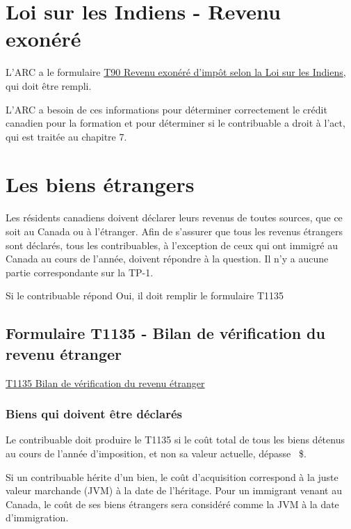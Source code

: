 \section{Loi sur les Indiens - Revenu exonéré}
\begin{intro}
	L'ARC a le formulaire \href{https://www.canada.ca/fr/agence-revenu/services/formulaires-publications/formulaires/t90.html}{T90 Revenu exonéré d'impôt selon la Loi sur les Indiens}, qui doit être rempli.
\end{intro}

\begin{note}
	L'ARC a besoin de ces informations pour déterminer correctement le crédit canadien pour la formation et pour déterminer si le contribuable a droit à l'\acrfull{act}, qui est traitée au chapitre 7.
\end{note}



\section{Les biens étrangers}
\ca
\begin{intro}
	Les résidents canadiens doivent déclarer leurs revenus de toutes sources, que ce soit au Canada ou à l'étranger. Afin de s'assurer que tous les revenus étrangers sont déclarés, tous les contribuables, à l'exception de ceux qui ont immigré au Canada au cours de l'année, doivent répondre à la question. Il n'y a aucune partie correspondante sur la TP-1.
\end{intro}
Si le contribuable répond \og Oui\fg{}, il doit remplir le formulaire T1135


\subsection{Formulaire T1135 - Bilan de vérification du revenu étranger}
\cat\href{https://www.canada.ca/fr/agence-revenu/services/formulaires-publications/formulaires/t1135.html}{T1135 Bilan de vérification du revenu étranger}

\subsubsection{Biens qui doivent être déclarés}
Le contribuable doit produire le T1135 si le coût total de tous les biens détenus au cours de l'année d'imposition, et non sa valeur actuelle, dépasse ~\$.

Si un contribuable hérite d'un bien, le coût d'acquisition correspond à la juste valeur marchande (JVM) à la date de l'héritage. Pour un immigrant venant au Canada, le coût de ses biens étrangers sera considéré comme la JVM à la date d'immigration.

